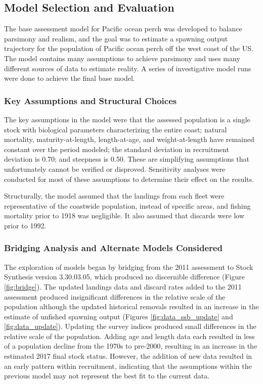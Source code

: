 \documentclass[12pt,]{article}
\begin{document}
\subsection{Model Selection and
Evaluation}\label{model-selection-and-evaluation}

The base assessment model for Pacific ocean perch was developed to
balance parsimony and realism, and the goal was to estimate a spawning
output trajectory for the population of Pacific ocean perch off the west
coast of the US. The model contains many assumptions to achieve
parsimony and uses many different sources of data to estimate reality. A
series of investigative model runs were done to achieve the final base
model.

\subsubsection{Key Assumptions and Structural
Choices}\label{key-assumptions-and-structural-choices}

The key assumptions in the model were that the assessed population is a
single stock with biological parameters characterizing the entire coast;
natural mortality, maturity-at-length, length-at-age, and
weight-at-length have remained constant over the period modeled; the
standard deviation in recruitment deviation is 0.70; and steepness is
0.50. These are simplifying assumptions that unfortunately cannot be
verified or disproved. Sensitivity analyses were conducted for most of
these assumptions to determine their effect on the results.

Structurally, the model assumed that the landings from each fleet were
representative of the coastwide population, instead of specific areas,
and fishing mortality prior to 1918 was negligible. It also assumed that
discards were low prior to 1992.

\subsubsection{Bridging Analysis and Alternate Models
Considered}\label{bridging-analysis-and-alternate-models-considered}

The exploration of models began by bridging from the 2011 assessment to
Stock Synthesis version 3.30.03.05, which produced no discernible
difference (Figure \ref{fig:bridge}). The updated landings data and
discard rates added to the 2011 assessment produced insignificant
differences in the relative scale of the population although the updated
historical removals resulted in an increase in the estimate of unfished
spawning output (Figures \ref{fig:data_ssb_update} and
\ref{fig:data_update}). Updating the survey indices produced small
differences in the relative scale of the population. Adding age and
length data each resulted in less of a population decline from the 1970s
to pre-2000, resulting in an increase in the estimated 2017 final stock
status. However, the addition of new data resulted in an early pattern
within recruitment, indicating that the assumptions within the previous
model may not represent the best fit to the current data.
\end{document}
